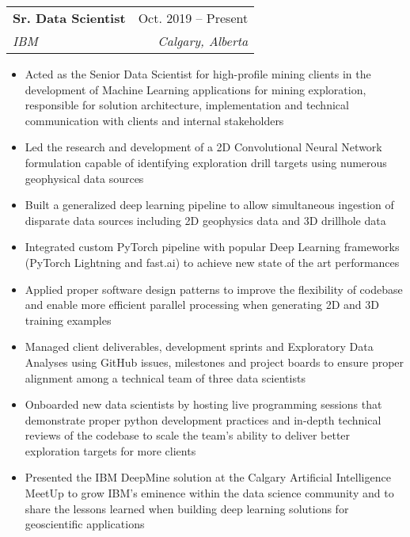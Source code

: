 \documentclass[letterpaper,11pt]{article}
\makeatletter
\newcommand{\resumeItem}[1]{
  \item\small{
    {#1 \vspace{-2pt}}
  }
}
\newcommand{\resumeSubheading}[4]{
  \vspace{-2pt}\item
    \begin{tabular*}{0.97\textwidth}[t]{l@{\extracolsep{\fill}}r}
      \textbf{#1} & #2 \\
      \textit{\small#3} & \textit{\small #4} \\
    \end{tabular*}\vspace{-7pt}
}
\newcommand{\resumeItemListStart}{\begin{itemize}}
\newcommand{\resumeItemListEnd}{\end{itemize}\vspace{-5pt}}
\makeatother
\begin{document}
    \resumeSubheading
      {Sr. Data Scientist}{Oct. 2019 -- Present}
      {IBM}{Calgary, Alberta}
      \resumeItemListStart
        \resumeItem{Acted as the Senior Data Scientist for high-profile mining clients in the development of Machine Learning 
        applications for mining exploration, responsible for solution architecture, implementation and technical communication 
        with clients and internal stakeholders}
        \resumeItem{Led the research and development of a 2D Convolutional Neural Network formulation capable of identifying 
        exploration drill targets using numerous geophysical data sources}
        \resumeItem{Built a generalized deep learning pipeline to allow simultaneous ingestion of disparate data 
        sources including 2D geophysics data and 3D drillhole data}
        \resumeItem{Integrated custom PyTorch pipeline with popular Deep Learning frameworks 
        (PyTorch Lightning and fast.ai) to achieve new state of the art performances}
        \resumeItem{Applied proper software design patterns to improve the flexibility of codebase and enable more efficient
        parallel processing when generating 2D and 3D training examples}
        \resumeItem{Managed client deliverables, development sprints and Exploratory Data Analyses using
        GitHub issues, milestones and project boards to ensure proper alignment among a technical team of 
        three data scientists}
        \resumeItem{Onboarded new data scientists by hosting live programming sessions that demonstrate proper 
        python development practices and in-depth technical reviews of the codebase to scale the team's ability to 
        deliver better exploration targets for more clients}
        \resumeItem{Presented the IBM DeepMine solution at the Calgary Artificial Intelligence MeetUp to grow 
        IBM’s eminence within the data science community and to share the lessons learned when building 
        deep learning solutions for geoscientific applications}
      \resumeItemListEnd
\end{document}
